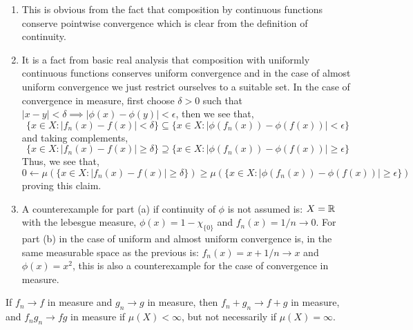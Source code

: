 \documentclass[12pt,a4paper]{article}
\begin{document}
\begin{solution}
\begin{enumerate}[label=\alph*.]
	\item This is obvious from the fact that composition by continuous functions conserve pointwise convergence which is clear from the definition of continuity.
	\item It is a fact from basic real analysis that composition with uniformly continuous functions conserves uniform convergence and in the case of almost uniform convergence we just restrict ourselves to a suitable set.
In the case of convergence in measure, first choose $\delta>0$ such that $|x-y|<\delta\implies|\phi(x)-\phi(y)|<\epsilon$, then we see that,
\[
	\{x\in X:|f_n(x)-f(x)|<\delta\}\subseteq\{x\in X:|\phi(f_n(x))-\phi(f(x))|<\epsilon\}
\]
and taking complements,
\[
	\{x\in X:|f_n(x)-f(x)|\geq\delta\}\supseteq\{x\in X:|\phi(f_n(x))-\phi(f(x))|\geq\epsilon\}
\]
Thus, we see that,
\[    
	0\longleftarrow\mu(\{x\in X:|f_n(x)-f(x)|\geq\delta\})\geq\mu(\{x\in X:|\phi(f_n(x))-\phi(f(x))|\geq\epsilon\})
\]
proving this claim. 
\item A counterexample for part (a) if continuity of $\phi$ is not assumed is: $X=\mathbb{R}$ with the lebesgue measure, $\phi(x)=1-\chi_{\{0\}}$ and $f_n(x)=1/n\to 0$. For part (b) in the case of uniform and almost uniform convergence is, in the same measurable space as the previous is: $f_n(x)=x+1/n\to x$ and $\phi(x)=x^2$, this is also a counterexample for the case of convergence in measure.
\end{enumerate}
\end{solution}
\begin{problem}\label{prob:2-38}
If $f_n \to f$ in measure and $g_n \to g$ in measure, then $f_n + g_n \to f + g$ in measure, and $f_ng_n \to fg$ in measure if $\mu(X) < \infty$, but not necessarily if $\mu(X) = \infty$.
\end{problem}
\end{document}
